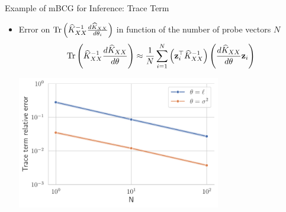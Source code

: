 \documentclass{beamer}
\begin{document}
\begin{frame}{Example of mBCG for Inference: Trace Term}
\begin{itemize}
    \item<1-> Error on $\operatorname{Tr} \left( \widehat K_{XX}^{-1} \frac{d \widehat K_{XX}}{d\theta_i} \right)$ in function of the number of probe vectors $N$
    {\small \begin{equation*}
        \operatorname{Tr} \left(\widehat K_{XX}^{-1} \frac{d \widehat K_{XX}}{d\theta} \right) 
        \approx \frac{1}{N} \sum_{i=1}^N \left( \boldsymbol{\mathbf{z}}_i^\top \widehat K_{XX}^{-1} \right) \left( \frac{d \widehat K_{XX}}{d\theta} \boldsymbol{\mathbf{z}}_i \right)
    \end{equation*}}
    \begin{center}
        \includegraphics[width=0.7\textwidth]{report/res/inference_traces.pdf}
    \end{center}
\end{itemize}
\end{frame}
\end{document}
